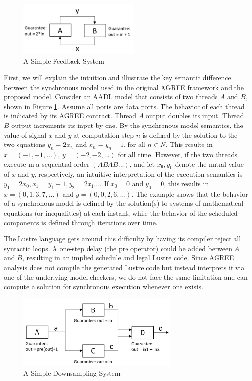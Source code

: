 \begin{figure}[ht!]
\centering
\includegraphics[width=60mm]{simpleFeedback.jpg}
\caption{A Simple Feedback System\label{motivationFig1}}
\end{figure}

First, we will explain the intuition and illustrate the key semantic difference between the synchronous model used in the original AGREE framework and the proposed model.
Consider an AADL model that consists of two threads $A$ and $B$, shown in Figure \ref{motivationFig1}. Assume all ports are data ports. The behavior of each thread is indicated by its AGREE contract. Thread $A$ output doubles its input. Thread $B$ output increments its input by one. By the synchronous model semantics, the value of signal $x$ and $y$ at computation step $n$ is defined by the solution to the two equations $y_n = 2x_n$ and $x_n = y_n+1$, for all $n \in N$. This results in $x = (-1, -1, …)$, $y = (-2, -2, …)$ for all time. However, if the two threads execute in a sequential order $(ABAB...)$, and let $x_0, y_0$ denote the initial value of $x$ and $y$, respectively, an intuitive interpretation of the execution semantics is $y_1 = 2x_0, x_1 = y_1+1, y_2 = 2x_1...$. If $x_0 = 0$ and  $y_0 = 0$, this results in $x = (0, 1, 3, 7,…)$ and $y = (0, 0, 2, 6, …)$. The example shows that the behavior of a synchronous model is defined by the solution(s) to systems of mathematical equations (or inequalities) at each instant, while the behavior of the scheduled components is defined through iterations over time.  

The Lustre language gets around this difficulty by having its compiler reject all syntactic loops.  A one-step delay (the \textsf{pre} operator) could be added between $A$ and $B$, resulting in an implied schedule and legal Lustre code.  Since AGREE analysis does not compile the generated Lustre code but instead interprets it via one of the underlying model checkers, we do not face the same limitation and can compute a solution for synchronous execution whenever one exists.  

\begin{figure}[ht!]
\centering
\includegraphics[width=80mm]{downsample.jpg}
\caption{A Simple Downsampling System\label{motivationFig2}}
\end{figure}

